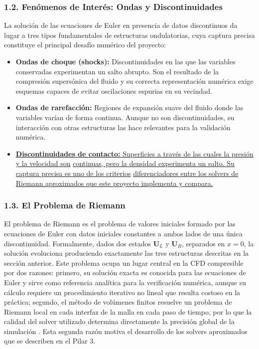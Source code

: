 \documentclass[11pt,openany]{book}
\begin{document}
        \subsubsection{1.2. Fenómenos de Interés: Ondas y Discontinuidades}\textbf{}

        La solución de las ecuaciones de Euler en presencia de datos discontinuos da lugar a tres tipos fundamentales de estructuras ondulatorias, cuya captura precisa constituye el principal desafío numérico del proyecto:

        \begin{itemize}
            \item \textbf{Ondas de choque (shocks): }Discontinuidades en las que las variables conservadas experimentan un salto abrupto. Son el resultado de la compresión supersónica del fluido y su correcta representación numérica exige esquemas capaces de evitar oscilaciones espurias en su vecindad.
            \item \textbf{Ondas de rarefacción: }Regiones de expansión suave del fluido donde las variables varían de forma continua. Aunque no son discontinuidades, su interacción con otras estructuras las hace relevantes para la validación numérica.
            \item \underline{\textbf{Discontinuidades  de contacto: }Superficies a través de las cuales la presión y la velocidad son} \underline{continuas, pero la densidad experimenta un salto. Su captura precisa es uno de los criterios} \underline{diferenciadores entre los solvers de Riemann aproximados que este proyecto implementa y compara.}
        \end{itemize}

        \subsubsection{1.3. El Problema de Riemann}\textbf{}

        El problema de Riemann es el problema de valores iniciales formado por las ecuaciones de Euler con datos iniciales constantes a ambos lados de una única discontinuidad. Formalmente, dados dos estados $\mathbf{U}_L$ y $\mathbf{U}_R$, separados en $x = 0$, la solución evoluciona produciendo exactamente las tres estructuras descritas en la sección anterior. Este problema ocupa un lugar central en la CFD compresible por dos razones: primero, su solución exacta es conocida para las ecuaciones de Euler y sirve como referencia analítica para la verificación numérica, aunque su cálculo requiere un procedimiento iterativo no lineal que resulta costoso en la práctica; segundo, el método de volúmenes finitos resuelve un problema de Riemann local en cada interfaz de la malla en cada paso de tiempo, por lo que la calidad del solver utilizado determina directamente la precisión global de la simulación \parencite{toro2013riemann}. Esta segunda razón motiva el desarrollo de los solvers aproximados que se describen en el Pilar 3.\textbf{}
\end{document}
